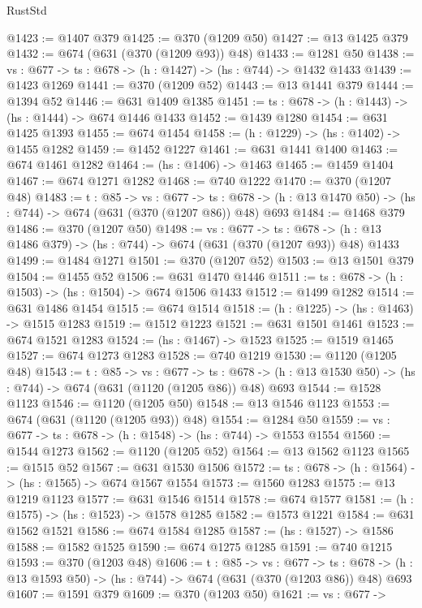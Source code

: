\begin{lexlean}{RustStd}
\begin{coremodule}
@1423 := @1407 @379
@1425 := @370 (@1209 @50)
@1427 := @13 @1425 @379
@1432 := @674 (@631 (@370 (@1209 @93)) @48)
@1433 := @1281 @50
@1438 := {vs : @677} -> {ts : @678} -> (h : @1427) -> (hs : @744) -> @1432 @1433
@1439 := @1423 @1269
@1441 := @370 (@1209 @52)
@1443 := @13 @1441 @379
@1444 := @1394 @52
@1446 := @631 @1409 @1385
@1451 := {ts : @678} -> (h : @1443) -> (hs : @1444) -> @674 @1446 @1433
@1452 := @1439 @1280
@1454 := @631 @1425 @1393
@1455 := @674 @1454
@1458 := (h : @1229) -> (hs : @1402) -> @1455 @1282
@1459 := @1452 @1227
@1461 := @631 @1441 @1400
@1463 := @674 @1461 @1282
@1464 := (hs : @1406) -> @1463
@1465 := @1459 @1404
@1467 := @674 @1271 @1282
@1468 := @740 @1222
@1470 := @370 (@1207 @48)
@1483 := {t : @85} ->
  {vs : @677} ->
  {ts : @678} -> (h : @13 @1470 @50) -> (hs : @744) -> @674 (@631 (@370 (@1207 @86)) @48) @693
@1484 := @1468 @379
@1486 := @370 (@1207 @50)
@1498 := {vs : @677} ->
  {ts : @678} -> (h : @13 @1486 @379) -> (hs : @744) -> @674 (@631 (@370 (@1207 @93)) @48) @1433
@1499 := @1484 @1271
@1501 := @370 (@1207 @52)
@1503 := @13 @1501 @379
@1504 := @1455 @52
@1506 := @631 @1470 @1446
@1511 := {ts : @678} -> (h : @1503) -> (hs : @1504) -> @674 @1506 @1433
@1512 := @1499 @1282
@1514 := @631 @1486 @1454
@1515 := @674 @1514
@1518 := (h : @1225) -> (hs : @1463) -> @1515 @1283
@1519 := @1512 @1223
@1521 := @631 @1501 @1461
@1523 := @674 @1521 @1283
@1524 := (hs : @1467) -> @1523
@1525 := @1519 @1465
@1527 := @674 @1273 @1283
@1528 := @740 @1219
@1530 := @1120 (@1205 @48)
@1543 := {t : @85} ->
  {vs : @677} ->
  {ts : @678} -> (h : @13 @1530 @50) -> (hs : @744) -> @674 (@631 (@1120 (@1205 @86)) @48) @693
@1544 := @1528 @1123
@1546 := @1120 (@1205 @50)
@1548 := @13 @1546 @1123
@1553 := @674 (@631 (@1120 (@1205 @93)) @48)
@1554 := @1284 @50
@1559 := {vs : @677} -> {ts : @678} -> (h : @1548) -> (hs : @744) -> @1553 @1554
@1560 := @1544 @1273
@1562 := @1120 (@1205 @52)
@1564 := @13 @1562 @1123
@1565 := @1515 @52
@1567 := @631 @1530 @1506
@1572 := {ts : @678} -> (h : @1564) -> (hs : @1565) -> @674 @1567 @1554
@1573 := @1560 @1283
@1575 := @13 @1219 @1123
@1577 := @631 @1546 @1514
@1578 := @674 @1577
@1581 := (h : @1575) -> (hs : @1523) -> @1578 @1285
@1582 := @1573 @1221
@1584 := @631 @1562 @1521
@1586 := @674 @1584 @1285
@1587 := (hs : @1527) -> @1586
@1588 := @1582 @1525
@1590 := @674 @1275 @1285
@1591 := @740 @1215
@1593 := @370 (@1203 @48)
@1606 := {t : @85} ->
  {vs : @677} ->
  {ts : @678} -> (h : @13 @1593 @50) -> (hs : @744) -> @674 (@631 (@370 (@1203 @86)) @48) @693
@1607 := @1591 @379
@1609 := @370 (@1203 @50)
@1621 := {vs : @677} ->

\end{coremodule}
\end{lexlean}
